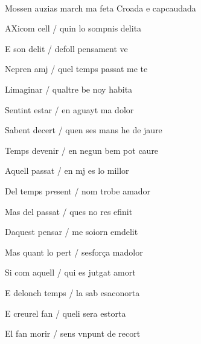 \documentclass[12pt]{article}
\renewcommand{\espaiAbansEtiquetaPoema}{\vspace{0ex}}
\begin{document}
\begin{estrofa}

\espaiAbansEtiquetaPoema

\\

\begin{rubrica}

\pagina{[49r]}\clauOberta Mossen auzias march ma feta Croada e capcaudada \clauTancada

\end{rubrica}

\end{estrofa}


\begin{estrofa}

 AXicom cell / quin lo sompnis delita

 E son delit / defoll pensament ve

 Nepren amj / quel temps passat me te

 Limaginar / qualtre be noy habita

 Sentint estar / en aguayt ma dolor

 Sabent decert / quen ses mans he de jaure

 Temps devenir / en negun bem pot caure

 Aquell passat / en mj es lo millor

\end{estrofa}



\begin{estrofa}

 Del temps p\textit{re}sent / nom trobe amador

 Mas del passat / ques no res efinit

 Daquest pensar / me soiorn emdelit

 Mas quant lo pert / sesfor\c{c}a madolor

 Si com aquell / qui es jutgat amort

 E delonch temps / la sab esaconorta

 E creurel fan / queli sera estorta

 El fan morir / sens vnpunt de recort

\end{estrofa}
\end{document}

